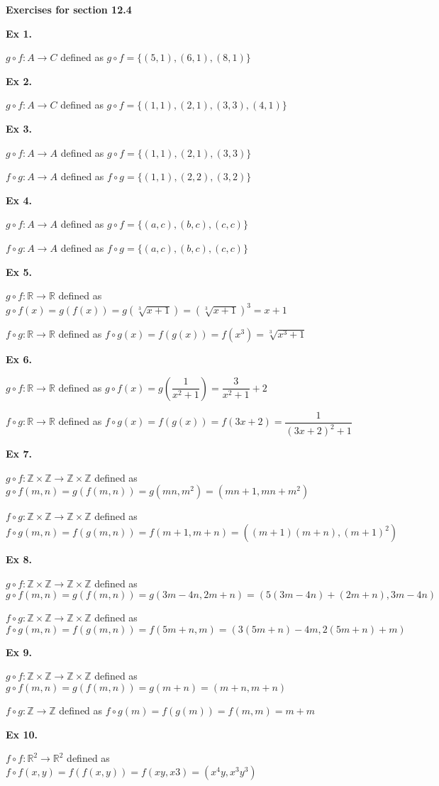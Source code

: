 \documentclass{article}
\date{}
\author{}
\begin{document}
\centerline{\textbf{Exercises for section 12.4}}

\textbf{Ex 1.}

$g \circ f: A \rightarrow C$ defined as $g \circ f = \{(5, 1), (6, 1), (8,1)\}$

\textbf{Ex 2.}

$g \circ f: A \rightarrow C$ defined as $g \circ f = \{(1,1),(2,1),(3,3),(4,1)\}$

\textbf{Ex 3.}

$g \circ f: A \rightarrow A$ defined as $g \circ f = \{(1,1), (2,1), (3,3)\}$

$f \circ g: A \rightarrow A$ defined as $f \circ g = \{(1,1), (2,2), (3,2)\}$

\textbf{Ex 4.}

$g \circ f: A \rightarrow A$ defined as $g \circ f = \{(a,c),(b,c),(c,c)\}$

$f \circ g: A \rightarrow A$ defined as $f \circ g = \{(a,c),(b,c),(c,c)\}$

\textbf{Ex 5.}

$g \circ f: \mathbb{R} \rightarrow \mathbb{R}$ defined as $g \circ f(x)=g(f(x))=g(\sqrt[3]{x+1})= \left(\sqrt[3]{x+1}\right)^3=x+1$

$f \circ g: \mathbb{R} \rightarrow \mathbb{R}$ defined as $f \circ g(x) = f(g(x))=f(x^3)=\sqrt[3]{x^3+1}$

\textbf{Ex 6.}

$g \circ f: \mathbb{R} \rightarrow \mathbb{R}$ defined as $g \circ f(x)=g(\dfrac{1}{x^2+1})= \dfrac{3}{x^2+1}+2$

$f \circ g: \mathbb{R} \rightarrow \mathbb{R}$ defined as $f \circ g(x) = f(g(x))=f(3x+2)=\dfrac{1}{\left(3x+2\right)^2+1}$

\textbf{Ex 7.}

$g \circ f: \mathbb{Z} \times \mathbb{Z} \rightarrow \mathbb{Z} \times \mathbb{Z}$ defined as $g \circ f(m, n)=g(f(m, n))=g(mn, m^2)= (mn+1, mn+m^2)$

$f \circ g: \mathbb{Z} \times \mathbb{Z} \rightarrow \mathbb{Z} \times \mathbb{Z}$ defined as $f \circ g(m, n) = f(g(m, n))=f(m+1, m+n)=((m+1)(m+n), (m+1)^2)$

\textbf{Ex 8.}

$g \circ f: \mathbb{Z} \times \mathbb{Z} \rightarrow \mathbb{Z} \times \mathbb{Z}$ defined as $g \circ f(m, n)=g(f(m, n))=g(3m-4n, 2m+n)= (5(3m-4n)+(2m+n),3m-4n)$

$f \circ g: \mathbb{Z} \times \mathbb{Z} \rightarrow \mathbb{Z} \times \mathbb{Z}$ defined as $f \circ g(m, n) = f(g(m, n))=f(5m+n, m)=(3(5m+n)-4m, 2(5m+n)+m)$

\textbf{Ex 9.}

$g \circ f: \mathbb{Z} \times \mathbb{Z} \rightarrow \mathbb{Z} \times \mathbb{Z}$ defined as $g \circ f(m, n)=g(f(m, n))=g(m+n)= (m+n, m+n)$

$f \circ g: \mathbb{Z} \rightarrow \mathbb{Z}$ defined as $f \circ g(m) = f(g(m))=f(m, m)=m+m$

\textbf{Ex 10.}

$f \circ f: \mathbb{R}^2 \rightarrow \mathbb{R}^2$ defined as $f \circ f(x,y) = f(f(x,y))=f(xy, x3)=(x^4y, x^3y^3)$
\end{document}
